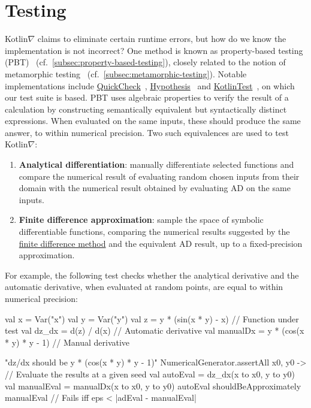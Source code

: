 \documentclass[12pt,initial,twoside,maitrise]{dms}
\numberwithin{equation}{section}
\numberwithin{table}{chapter}
\numberwithin{figure}{chapter}
\begin{document}
\section{Testing}\label{sec:testing}

Kotlin$\nabla$ claims to eliminate certain runtime errors, but how do we know the implementation is not incorrect? One method is known as property-based testing (PBT)~\citep{fink1997property} (cf.~\autoref{subsec:property-based-testing}), closely related to the notion of metamorphic testing~\citep{chen1998metamorphic} (cf.~\autoref{subsec:metamorphic-testing}). Notable implementations include \href{http://www.cse.chalmers.se/~rjmh/QuickCheck/manual.html}{QuickCheck}~\citep{claessen2011quickcheck}, \href{https://hypothesis.readthedocs.io/en/latest/}{Hypothesis}~\citep{Hypothesis} and \href{https://github.com/kotlintest/kotlintest}{KotlinTest}~\citep{kotlintest}, on which our test suite is based. PBT uses algebraic properties to verify the result of a calculation by constructing semantically equivalent but syntactically distinct expressions. When evaluated on the same inputs, these should produce the same answer, to within numerical precision. Two such equivalences are used to test Kotlin$\nabla$: \\
%
\begin{enumerate}
    \item \textbf{Analytical differentiation}: manually differentiate selected functions and compare the numerical result of evaluating random chosen inputs from their domain with the numerical result obtained by evaluating AD on the same inputs.
    \item \textbf{Finite difference approximation}: sample the space of symbolic differentiable functions, comparing the numerical results suggested by the \hyperref[sec:fdm]{finite difference method} and the equivalent AD result, up to a fixed-precision approximation. \\
\end{enumerate}
%
For example, the following test checks whether the analytical derivative and the automatic derivative, when evaluated at random points, are equal to within numerical precision:
%
\begin{kotlinlisting}
val x = Var("x")
val y = Var("y")
val z = y * (sin(x * y) - x)            // Function under test
val dz_dx = d(z) / d(x)                 // Automatic derivative
val manualDx = y * (cos(x * y) * y - 1) // Manual derivative

"dz/dx should be y * (cos(x * y) * y - 1)" {
    NumericalGenerator.assertAll { x0, y0 ->
        // Evaluate the results at a given seed
        val autoEval = dz_dx(x to x0, y to y0)
        val manualEval = manualDx(x to x0, y to y0)
        autoEval shouldBeApproximately manualEval // Fails iff eps < |adEval - manualEval|
    }
}
\end{kotlinlisting}
\end{document}
